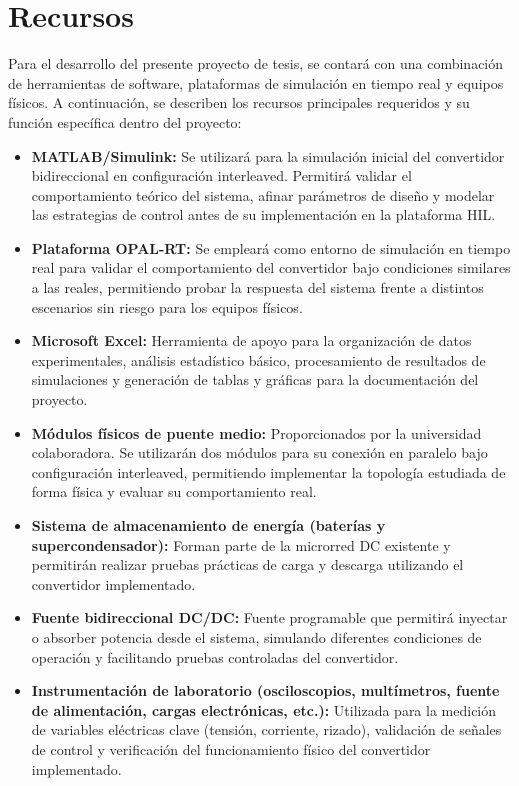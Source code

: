 \section{Recursos}

Para el desarrollo del presente proyecto de tesis, se contará con una combinación de herramientas de software, plataformas de simulación en tiempo real y equipos físicos. A continuación, se describen los recursos principales requeridos y su función específica dentro del proyecto:

\begin{itemize}
    \item \textbf{MATLAB/Simulink:} Se utilizará para la simulación inicial del convertidor bidireccional en configuración interleaved. Permitirá validar el comportamiento teórico del sistema, afinar parámetros de diseño y modelar las estrategias de control antes de su implementación en la plataforma HIL.

    \item \textbf{Plataforma OPAL-RT:} Se empleará como entorno de simulación en tiempo real para validar el comportamiento del convertidor bajo condiciones similares a las reales, permitiendo probar la respuesta del sistema frente a distintos escenarios sin riesgo para los equipos físicos.

    \item \textbf{Microsoft Excel:} Herramienta de apoyo para la organización de datos experimentales, análisis estadístico básico, procesamiento de resultados de simulaciones y generación de tablas y gráficas para la documentación del proyecto.

    \item \textbf{Módulos físicos de puente medio:} Proporcionados por la universidad colaboradora. Se utilizarán dos módulos para su conexión en paralelo bajo configuración interleaved, permitiendo implementar la topología estudiada de forma física y evaluar su comportamiento real.

    \item \textbf{Sistema de almacenamiento de energía (baterías y supercondensador):} Forman parte de la microrred DC existente y permitirán realizar pruebas prácticas de carga y descarga utilizando el convertidor implementado.

    \item \textbf{Fuente bidireccional DC/DC:} Fuente programable que permitirá inyectar o absorber potencia desde el sistema, simulando diferentes condiciones de operación y facilitando pruebas controladas del convertidor.

    \item \textbf{Instrumentación de laboratorio (osciloscopios, multímetros, fuente de alimentación, cargas electrónicas, etc.):} Utilizada para la medición de variables eléctricas clave (tensión, corriente, rizado), validación de señales de control y verificación del funcionamiento físico del convertidor implementado.
\end{itemize}

